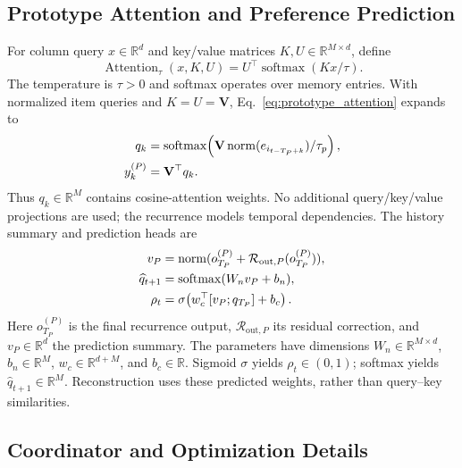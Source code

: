 ﻿\documentclass[sigconf,anonymous,review]{acmart}
\newcommand{\norm}[1]{\operatorname{norm}(#1)}
\newcommand{\softmax}{\operatorname{softmax}}
\begin{document}
\subsection{Prototype Attention and Preference Prediction}
\label{app:prototype_attention}
For column query $x\in\mathbb R^d$ and key/value matrices $K,U\in\mathbb R^{M\times d}$, define
\begin{equation}
 \operatorname{Attention}_{\tau}(x,K,U)=U^\top\softmax(Kx/\tau).
\end{equation}
The temperature is $\tau>0$ and softmax operates over memory entries. With normalized item queries and $K=U=\mathbf V$, Eq.~\eqref{eq:prototype_attention} expands to
\begin{align}
 q_k&=\softmax\!\left(\mathbf V\norm{e_{i_{t-T_P+k}}}/\tau_p\right),\notag\\
 y_k^{(P)}&=\mathbf V^\top q_k.
\end{align}
Thus $q_k\in\mathbb R^M$ contains cosine-attention weights. No additional query/key/value projections are used; the recurrence models temporal dependencies. The history summary and prediction heads are
\begin{align}
 v_P&=\norm{o_{T_P}^{(P)}+\mathcal R_{\mathrm{out},P}(o_{T_P}^{(P)})},\notag\\
 \widehat q_{t+1}&=\softmax(W_n v_P+b_n),\notag\\
 \rho_t&=\sigma\!\left(w_c^\top[v_P;q_{T_P}]+b_c\right).
\end{align}
Here $o_{T_P}^{(P)}$ is the final recurrence output, $\mathcal R_{\mathrm{out},P}$ its residual correction, and $v_P\in\mathbb R^d$ the prediction summary. The parameters have dimensions $W_n\in\mathbb R^{M\times d}$, $b_n\in\mathbb R^M$, $w_c\in\mathbb R^{d+M}$, and $b_c\in\mathbb R$. Sigmoid $\sigma$ yields $\rho_t\in(0,1)$; softmax yields $\widehat q_{t+1}\in\mathbb R^M$. Reconstruction uses these predicted weights, rather than query--key similarities.

\subsection{Coordinator and Optimization Details}
\end{document}
